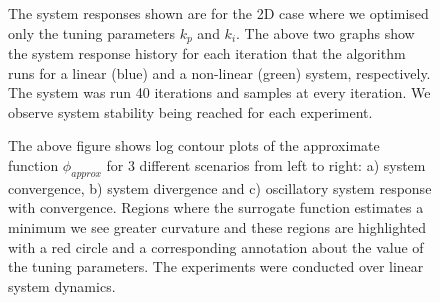 \documentclass[conference]{IEEEtran}
\theoremstyle{definition}
\begin{document}
\onecolumn 
\begin{figure}[h]
    \setlength{\abovecaptionskip}{0pt}
    \caption{The system responses shown are for the 2D case where we optimised only the tuning parameters $k_p$ and $k_i$. The above two graphs show the system response history for each iteration that the algorithm runs for a linear (blue) and a non-linear (green) system, respectively. The system was run 40 iterations and samples at every  iteration. We observe system stability being reached for each experiment.}
    \label{kpki}
\end{figure}
\vspace{-5mm}
\begin{figure}[h]
    \caption{The above figure shows log contour plots of the approximate function $\phi_{approx}$ for 3 different scenarios from left to right: a) system convergence, b) system divergence and c) oscillatory system response with convergence. Regions where the surrogate function estimates a minimum we see greater curvature and these regions are highlighted with a red circle and a corresponding annotation about the value of the tuning parameters. The experiments were conducted over linear system dynamics.}
    \label{kpki_contour}
\end{figure}
\vspace{-5mm}
\end{document}

